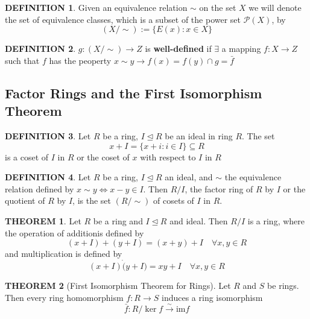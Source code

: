 \documentclass[10pt]{article}
\theoremstyle{definition}
\newtheorem{definition}{DEFINITION}[subsection]
\newtheorem{theorem}{THEOREM}[subsection]
\begin{document}
\begin{definition}
    Given an equivalence relation $\sim$ on the set $X$ we will denote the set of equivalence classes, which is a subset of the power set $\mathcal{P}(X)$, by $$(X/\sim) := \{E(x):x\in X\}$$
\end{definition}

\begin{definition}
    $g:(X/\sim) \rightarrow Z$ is \textbf{well-defined} if $\exists$ a mapping $f:X \rightarrow Z$ such that $f$ has the peoperty $x \sim y \rightarrow f(x) = f(y) \cap g = \bar{f}$ 
\end{definition}


\subsection{Factor Rings and the First Isomorphism Theorem}
\begin{definition}
    Let $R$ be a ring, $I \trianglelefteq R$ be an ideal in ring $R$. The set $$x + I = \{x+i:i\in I\}\subseteq R$$ is a coset of $I$ in $R$ or the coset of $x$ with respect to $I$ in $R$
\end{definition}

\begin{definition}
    Let $R$ be a ring, $I \trianglelefteq R$ an ideal, and $\sim$ the equivalence relation defined by $x \sim y \Leftrightarrow x - y \in I$. Then $R/I$, the factor ring of $R$ by $I$ or the quotient of $R$ by $I$, is the set $(R/ \sim)$ of cosets of $I$ in $R$.
\end{definition}

\begin{theorem}
    Let $R$ be a ring and $I \trianglelefteq R$ and ideal. Then $R/I$ is a ring, where the operation of additionis defined by
    $$(x+I)+(y+I) = (x+y) + I \quad \forall x, y \in R$$
    and multiplication is defined by
    $$(x + I)\dot(y+I) = xy + I \quad \forall x,y \in R$$
\end{theorem}

\begin{theorem}[First Isomorphism Theorem for Rings]
    Let $R$ and $S$ be rings. Then every ring homomorphism $f:R\longrightarrow S$ induces a ring isomorphism
    $$\bar{f}:R/\ker f \stackrel{\sim}{\rightarrow} \text{im} f$$
\end{theorem}


\end{document}
